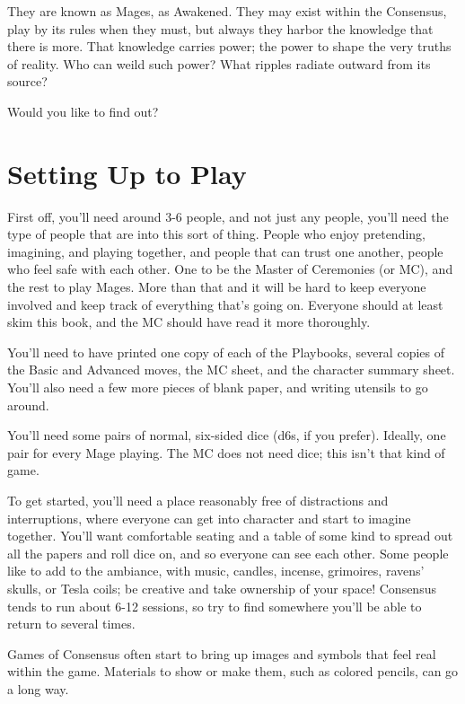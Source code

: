 \documentclass[
  oneside,
  statementpaper,
  9pt]{memoir}
\begin{document}
They are known as Mages, as Awakened. They may exist within the
Consensus, play by its rules when they must, but always they harbor the
knowledge that there is more. That knowledge carries power; the power to
shape the very truths of reality. Who can weild such power? What ripples
radiate outward from its source?

Would you like to find out?

\hypertarget{setting-up-to-play}{%
\section{Setting Up to Play}\label{setting-up-to-play}}

First off, you'll need around 3-6 people, and not just any people,
you'll need the type of people that are into this sort of thing. People
who enjoy pretending, imagining, and playing together, and people that
can trust one another, people who feel safe with each other. One to be
the Master of Ceremonies (or MC), and the rest to play Mages. More than
that and it will be hard to keep everyone involved and keep track of
everything that's going on. Everyone should at least skim this book, and
the MC should have read it more thoroughly.

You'll need to have printed one copy of each of the Playbooks, several
copies of the Basic and Advanced moves, the MC sheet, and the character
summary sheet. You'll also need a few more pieces of blank paper, and
writing utensils to go around.

You'll need some pairs of normal, six-sided dice (d6s, if you prefer).
Ideally, one pair for every Mage playing. The MC does not need dice;
this isn't that kind of game.

To get started, you'll need a place reasonably free of distractions and
interruptions, where everyone can get into character and start to
imagine together. You'll want comfortable seating and a table of some
kind to spread out all the papers and roll dice on, and so everyone can
see each other. Some people like to add to the ambiance, with music,
candles, incense, grimoires, ravens' skulls, or Tesla coils; be creative
and take ownership of your space! Consensus tends to run about 6-12
sessions, so try to find somewhere you'll be able to return to several
times.

Games of Consensus often start to bring up images and symbols that feel
real within the game. Materials to show or make them, such as colored
pencils, can go a long way.
\end{document}
